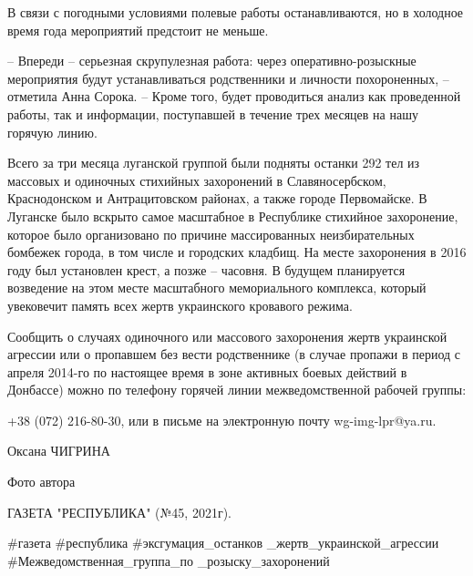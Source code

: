 В связи с погодными условиями полевые работы останавливаются, но в холодное
время года мероприятий предстоит не меньше.

– Впереди – серьезная скрупулезная работа: через оперативно-розыскные
мероприятия будут устанавливаться родственники и личности похороненных, –
отметила Анна Сорока. – Кроме того, будет проводиться анализ как проведенной
работы, так и информации, поступавшей в течение трех месяцев на нашу горячую
линию.

Всего за три месяца луганской группой были подняты останки 292 тел из массовых
и одиночных стихийных захоронений в Славяносербском, Краснодонском и
Антрацитовском районах, а также городе Первомайске. В Луганске было вскрыто
самое масштабное в Республике стихийное захоронение, которое было организовано
по причине массированных неизбирательных бомбежек города, в том числе и
городских кладбищ. На месте захоронения в 2016 году был установлен крест, а
позже – часовня. В будущем планируется возведение на этом месте масштабного
мемориального комплекса, который увековечит память всех жертв украинского
кровавого режима.

Сообщить о случаях одиночного или массового захоронения жертв украинской
агрессии или о пропавшем без вести родственнике (в случае пропажи в период с
апреля 2014-го по настоящее время в зоне активных боевых действий в Донбассе)
можно по телефону горячей линии межведомственной рабочей группы: 

+38 (072) 216-80-30, или в письме на электронную почту wg-img-lpr@ya.ru.

Оксана ЧИГРИНА

Фото автора

ГАЗЕТА "РЕСПУБЛИКА" (№45, 2021г).

\#газета \#республика \#эксгумация\_останков
\_жертв\_украинской\_агрессии
\#Межведомственная\_группа\_по
\_розыску\_захоронений
